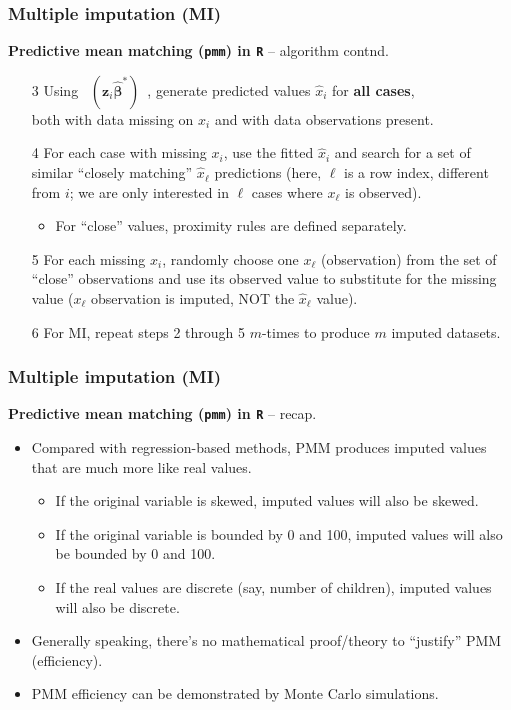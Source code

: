 \documentclass{beamer}
\begin{document}
\begin{frame}
\frametitle{Multiple imputation (MI)}
\textbf{Predictive mean matching (\texttt{pmm}) in \texttt{R}} -- algorithm contnd.\\
\bigskip
\begin{enumerate}
    \item[3] Using ~$(\bm{z}_i \hat{\bm{\beta}}^{\ast})$~, generate predicted values $\hat{x}_i$ for \textbf{all cases}, \\both with data missing on $x_i$ and with data observations present.
    \medskip
    \item[4] For each case with missing $x_i$, use the fitted $\hat{x}_i$ and search for a set of similar ``closely matching'' $\hat{x}_{\ell}$ predictions (here, $\ell$ is a row index, different from $i$; we are only interested in ${\ell}$ cases where $x_{\ell}$ is observed).
    \medskip
    \begin{itemize}
        \item For ``close'' values, proximity rules are defined separately.
    \end{itemize}
    \medskip
    \item[5] For each missing $x_i$, randomly choose one $x_{\ell}$ (observation) from the set of ``close'' observations and use its observed value to substitute for the missing value ($x_{\ell}$ observation is imputed, NOT the $\hat{x}_{\ell}$ value).
    \medskip
    \item[6] For MI, repeat steps 2 through 5 $m$-times to produce $m$ imputed datasets.  
\end{enumerate}
\end{frame}
\begin{frame}
\frametitle{Multiple imputation (MI)}
\textbf{Predictive mean matching (\texttt{pmm}) in \texttt{R}} -- recap.\\
\medskip
\begin{itemize}
    \item Compared with regression-based methods, PMM produces imputed values that are much more like real values. 
    \smallskip
    \begin{itemize}
        \item If the original variable is skewed, imputed values will also be skewed.
        \smallskip
        \item If the original variable is bounded by 0 and 100, imputed values will also be bounded by 0 and 100.
        \smallskip
        \item If the real values are discrete (say, number of children), imputed values will also be discrete. 
    \end{itemize} 
    \smallskip
    \item Generally speaking,  there’s no mathematical proof/theory to ``justify'' PMM (efficiency).
    \smallskip
    \item PMM efficiency can be demonstrated by Monte Carlo simulations.
\end{itemize}
\end{frame}
\end{document}
